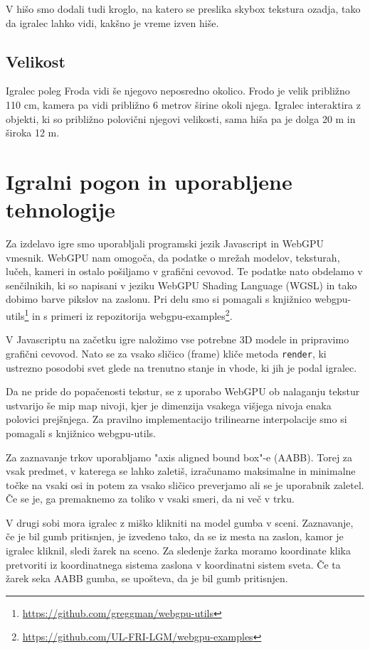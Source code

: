 \documentclass[a4paper,12pt]{article}
\begin{document}
V hišo smo dodali tudi kroglo, na katero se preslika skybox tekstura ozadja, tako da igralec lahko vidi, kakšno je vreme izven hiše.

\newpage

\subsection{Velikost}
Igralec poleg Froda vidi še njegovo neposredno okolico. Frodo je velik približno 110 cm, kamera pa vidi približno 6 metrov širine okoli njega. Igralec interaktira z objekti, ki so približno polovični njegovi velikosti, sama hiša pa je dolga 20 m in široka 12 m.


\section{Igralni pogon in uporabljene tehnologije}
Za izdelavo igre smo uporabljali programski jezik Javascript in WebGPU vmesnik. WebGPU nam omogoča, da podatke o mrežah modelov, teksturah, lučeh, kameri in ostalo pošiljamo v grafični cevovod. Te podatke nato obdelamo v senčilnikih, ki so napisani v jeziku WebGPU Shading Language (WGSL) in tako dobimo barve pikslov na zaslonu. Pri delu smo si pomagali s knjižnico webgpu-utils\footnote{\url{https://github.com/greggman/webgpu-utils}} in s primeri iz repozitorija webgpu-examples\footnote{\url{https://github.com/UL-FRI-LGM/webgpu-examples}}.

V Javascriptu na začetku igre naložimo vse potrebne 3D modele in pripravimo grafični cevovod. Nato se za vsako sličico (frame) kliče metoda \verb+render+, ki ustrezno posodobi svet glede na trenutno stanje in vhode, ki jih je podal igralec.

Da ne pride do popačenosti tekstur, se z uporabo WebGPU ob nalaganju tekstur ustvarijo še mip map nivoji, kjer je dimenzija vsakega višjega nivoja enaka polovici prejšnjega. Za pravilno implementacijo trilinearne interpolacije smo si pomagali s knjižnico webgpu-utils.

Za zaznavanje trkov uporabljamo "axis aligned bound box"-e (AABB). Torej za vsak predmet, v katerega se lahko zaletiš, izračunamo maksimalne in minimalne točke na vsaki osi in potem za vsako sličico preverjamo ali se je uporabnik zaletel. Če se je, ga premaknemo za toliko v vsaki smeri, da ni več v trku.

V drugi sobi mora igralec z miško klikniti na model gumba v sceni. Zaznavanje, če je bil gumb pritisnjen, je izvedeno tako, da se iz mesta na zaslon, kamor je igralec kliknil, sledi žarek na sceno. Za sledenje žarka moramo koordinate klika pretvoriti iz koordinatnega sistema zaslona v koordinatni sistem sveta. Če ta žarek seka AABB gumba, se upošteva, da je bil gumb pritisnjen.
\end{document}
